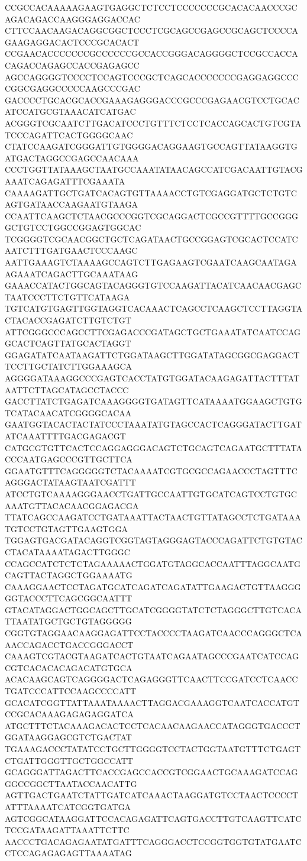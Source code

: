 CCGCCACAAAAAGAAGTGAGGCTCTCCTCCCCCCCGCACACAACCCGCAGACAGACCAAGGGAGGACCAC
CTTCCAACAAGACAGGCGGCTCCCTCGCAGCCGAGCCGCAGCTCCCCAGAAGAGGACACTCCCGCACACT
CCGAACACCCCCCCGCCCCCCGCCACCGGGACAGGGGCTCCGCCACCACAGACCAGAGCCACCGAGAGCC
AGCCAGGGGTCCCCTCCAGTCCCGCTCAGCACCCCCCCGAGGAGGCCCCGGCGAGGCCCCCAAGCCCGAC
GACCCCTGCACGCACCGAAAGAGGGACCCGCCCGAGAACGTCCTGCACATCCATGCGTAAACATCATGAC
ACGGGTCGCAATCTTGACATCCCTGTTTCTCCTCACCAGCACTGTCGTATCCCAGATTCACTGGGGCAAC
CTATCCAAGATCGGGATTGTGGGGACAGGAAGTGCCAGTTATAAGGTGATGACTAGGCCGAGCCAACAAA
CCCTGGTTATAAAGCTAATGCCAAATATAACAGCCATCGACAATTGTACGAAATCAGAGATTTCGAAATA
CAAAAGATTGCTGATCACAGTGTTAAAACCTGTCGAGGATGCTCTGTCAGTGATAACCAAGAATGTAAGA
CCAATTCAAGCTCTAACGCCCGGTCGCAGGACTCGCCGTTTTGCCGGGGCTGTCCTGGCCGGAGTGGCAC
TCGGGGTCGCAACGGCTGCTCAGATAACTGCCGGAGTCGCACTCCATCAATCTTTGATGAACTCCCAAGC
AATTGAAAGTCTAAAAGCCAGTCTTGAGAAGTCGAATCAAGCAATAGAAGAAATCAGACTTGCAAATAAG
GAAACCATACTGGCAGTACAGGGTGTCCAAGATTACATCAACAACGAGCTAATCCCTTCTGTTCATAAGA
TGTCATGTGAGTTGGTAGGTCACAAACTCAGCCTCAAGCTCCTTAGGTACTACACCGAGATCTTGTCTGT
ATTCGGGCCCAGCCTTCGAGACCCGATAGCTGCTGAAATATCAATCCAGGCACTCAGTTATGCACTAGGT
GGAGATATCAATAAGATTCTGGATAAGCTTGGATATAGCGGCGAGGACTTCCTTGCTATCTTGGAAAGCA
AGGGGATAAAGGCCCGAGTCACCTATGTGGATACAAGAGATTACTTTATAATTCTTAGCATAGCCTACCC
GACCTTATCTGAGATCAAAGGGGTGATAGTTCATAAAATGGAAGCTGTGTCATACAACATCGGGGCACAA
GAATGGTACACTACTATCCCTAAATATGTAGCCACTCAGGGATACTTGATATCAAATTTTGACGAGACGT
CATGCGTGTTCACTCCAGGAGGGACAGTCTGCAGTCAGAATGCTTTATACCCAATGAGCCCGTTGCTTCA
GGAATGTTTCAGGGGGTCTACAAAATCGTGCGCCAGAACCCTAGTTTCAGGGACTATAAGTAATCGATTT
ATCCTGTCAAAAGGGAACCTGATTGCCAATTGTGCATCAGTCCTGTGCAAATGTTACACAACGGAGACGA
TTATCAGCCAAGATCCTGATAAATTACTAACTGTTATAGCCTCTGATAAATGTCCTGTAGTTGAAGTGGA
TGGAGTGACGATACAGGTCGGTAGTAGGGAGTACCCAGATTCTGTGTACCTACATAAAATAGACTTGGGC
CCAGCCATCTCTCTAGAAAAACTGGATGTAGGCACCAATTTAGGCAATGCAGTTACTAGGCTGGAAAATG
CAAAGGAACTCCTAGATGCATCAGATCAGATATTGAAGACTGTTAAGGGGGTACCCTTCAGCGGCAATTT
GTACATAGGACTGGCAGCTTGCATCGGGGTATCTCTAGGGCTTGTCACATTAATATGCTGCTGTAGGGGG
CGGTGTAGGAACAAGGAGATTCCTACCCCTAAGATCAACCCAGGGCTCAAACCAGACCTGACCGGGACCT
CAAAGTCGTACGTAAGATCACTGTAATCAGAATAGCCCGAATCATCCAGCGTCACACACAGACATGTGCA
ACACAAGCAGTCAGGGGACTCAGAGGGTTCAACTTCCGATCCTCAACCTGATCCCATTCCAAGCCCCATT
GCACATCGGTTATTAAATAAAACTTAGGACGAAAGGTCAATCACCATGTCCGCACAAAGAGAGAGGATCA
ATGCTTTCTACAAAGACACTCCTCACAACAAGAACCATAGGGTGACCCTGGATAAGGAGCGTCTGACTAT
TGAAAGACCCTATATCCTGCTTGGGGTCCTACTGGTAATGTTTCTGAGTCTGATTGGGTTGCTGGCCATT
GCAGGGATTAGACTTCACCGAGCCACCGTCGGAACTGCAAAGATCCAGGGCCGGCTTAATACCAACATTG
AGTTGACTGAATCTATTGATCATCAAACTAAGGATGTCCTAACTCCCCTATTTAAAATCATCGGTGATGA
AGTCGGCATAAGGATTCCACAGAGATTCAGTGACCTTGTCAAGTTCATCTCCGATAAGATTAAATTCTTC
AACCCTGACAGAGAATATGATTTCAGGGACCTCCGGTGGTGTATGAATCCTCCAGAGAGAGTTAAAATAG
